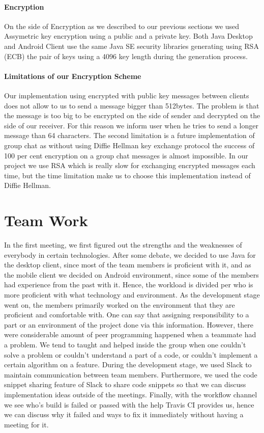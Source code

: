 \documentclass[11pt,a4paper]{report}
\begin{document}
\subsubsection{Encryption}
On the side of Encryption as we described to our previous sections we used Assymetric key encryption using a public and a private key. Both Java Desktop and Android Client use the same Java SE security libraries generating using RSA (ECB) the pair of keys using a 4096 key length during the generation process.
\subsubsection{Limitations of our Encryption Scheme}
Our implementation using encrypted with public key messages between clients does not allow to us to send a message bigger than 512bytes. The problem is that the message is too big to be encrypted on the side of sender and decrypted on the side of our receiver. For this reason we inform user when he tries to send a longer message than 64 characters. The second limitation is a future implementation of group chat as without using  Diffie Hellman key exchange protocol the success of 100 per cent encryption on a group chat messages is almost impossible. In our project we use RSA which is really slow for exchanging encrypted messages each time, but the time limitation make us to choose this implementation instead of Diffie Hellman.
\chapter{Team Work}
In the first meeting, we first figured out the strengths and the weaknesses of everybody in certain technologies. After some debate, we decided to use Java for the desktop client, since most of the team members is proficient with it, and as the mobile client we decided on Android environment, since some of the members had experience from the past with it. Hence, the workload is divided per who is more proficient with what technology and environment. 
As the development stage went on, the members primarily worked on the environment that they are proficient and comfortable with. One can say that assigning responsibility to a part or an environment of the project done via this information. However, there were considerable amount of peer programming happened when a teammate had a problem. We tend to taught and helped inside the group when one couldn’t solve a problem or couldn’t understand a part of a code, or couldn’t implement a certain algorithm on a feature. 
During the development stage, we used Slack to maintain communication between team members. Furthermore, we used the code snippet sharing feature of Slack to share code snippets so that we can discuss implementation ideas outside of the meetings. Finally, with the workflow channel we see who’s build is failed or passed with the help Travis CI provides us, hence we can discuss why it failed and ways to fix it immediately without having a meeting for it. 
\end{document}

